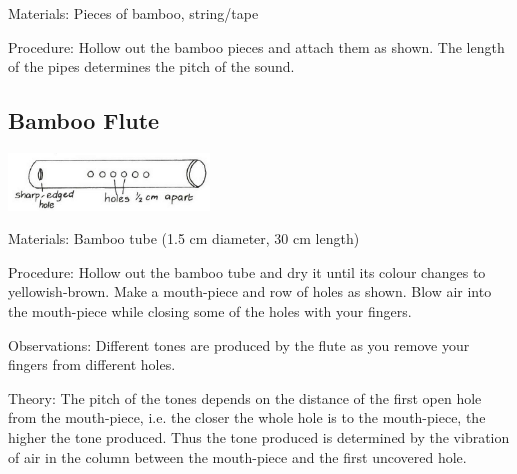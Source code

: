 \begin{multicols}{2}
\begin{description*}
\item[Materials:]{Pieces of bamboo, string/tape}
\item[Procedure:]{Hollow out the bamboo pieces and attach them as shown. The length of the pipes determines the pitch of the sound.}
\end{description*}

\subsection{Bamboo Flute}

\begin{center}
\includegraphics[width=0.4\textwidth]{./img/vso/bamboo-flute.png}
\end{center}

\begin{description*}
\item[Materials:]{Bamboo tube (1.5 cm diameter, 30 cm length)}
\item[Procedure:]{Hollow out the bamboo tube and dry it until its colour changes to yellowish-brown. Make a mouth-piece and row of holes as shown. Blow air into the mouth-piece while closing some of the holes with your fingers.}
\item[Observations:]{Different tones are produced by the flute as you remove your fingers from different holes.}
\item[Theory:]{The pitch of the tones depends on the distance of the first open hole from the mouth-piece, i.e. the closer the whole hole is to the mouth-piece, the higher the tone produced. Thus the tone produced is determined by the vibration of air in the column between the mouth-piece and the first uncovered hole.}
\end{description*}


\end{multicols}
